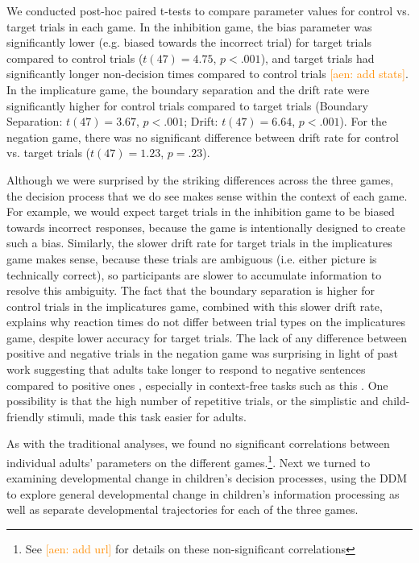 \documentclass[10pt,letterpaper]{article}
\newcommand{\aen}[1]{\textcolor{DarkOrange}{[aen: #1]}}
\begin{document}
We conducted post-hoc paired t-tests to compare parameter values for control vs. target trials in each game.  In the inhibition game, the bias parameter was significantly lower (e.g. biased towards the incorrect trial) for target trials compared to control trials ($t(47) = 4.75$, $p< .001$), and target trials had significantly longer non-decision times compared to control trials \aen{add stats}.  In the implicature game, the boundary separation and the drift rate were significantly higher for control trials compared to target trials (Boundary Separation: $t(47) = 3.67$, $p< .001$; Drift: $t(47) = 6.64$, $p< .001$).  For the negation game, there was no significant difference between drift rate for control vs. target trials ($t(47) = 1.23$, $p = .23$).  

Although we were surprised by the striking differences across the three games, the decision process that we do see makes sense within the context of each game.  For example, we would expect target trials in the inhibition game to be biased towards incorrect responses, because the game is intentionally designed to create such a bias.  Similarly, the slower drift rate for target trials in the implicatures game makes sense, because these trials are ambiguous (i.e. either picture is technically correct), so participants are slower to accumulate information to resolve this ambiguity. The fact that the boundary separation is higher for control trials in the implicatures game, combined with this slower drift rate, explains why reaction times do not differ between trial types on the implicatures game, despite lower accuracy for target trials.  The lack of any difference between positive and negative trials in the negation game was surprising in light of past work suggesting that adults take longer to respond to negative sentences compared to positive ones \cite{hclark1972}, especially in context-free tasks such as this \cite{nordmeyer2014a}.  One possibility is that the high number of repetitive trials, or the simplistic and child-friendly stimuli, made this task easier for adults.

As with the traditional analyses, we found no significant correlations between individual adults' parameters on the different games.\footnote{See \aen{add url} for details on these non-significant correlations}.  Next we turned to examining developmental change in children's decision processes, using the DDM to explore general developmental change in children's information processing as well as separate developmental trajectories for each of the three games.
\end{document}

